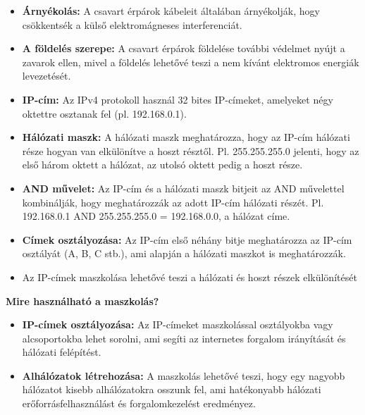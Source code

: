 \documentclass[11pt,a4paper]{article}
\begin{document}
\begin{tcolorbox}[colback=blue!5!white,colframe=blue!50!black,title= 42. Ismertesse az ethernet hálózaton használt eszközöket!]
\begin{itemize}
                                            \item \textbf{Árnyékolás:} A csavart érpárok kábeleit általában árnyékolják, hogy csökkentsék a külső elektromágneses interferenciát.
                                            \item \textbf{A földelés szerepe:} A csavart érpárok földelése további védelmet nyújt a zavarok ellen, mivel a földelés lehetővé teszi a nem kívánt elektromos energiák levezetését.
                                        \end{itemize}
            \end{tcolorbox}
            
            \begin{tcolorbox}[colback=blue!5!white,colframe=blue!50!black,title= 43. Ismertesse az internetes címek maszkolási algoritmusát!]
                \begin{itemize}
                    \item \textbf{IP-cím:} Az IPv4 protokoll használ 32 bites IP-címeket, amelyeket négy oktettre osztanak fel (pl. 192.168.0.1).
                    \item \textbf{Hálózati maszk:} A hálózati maszk meghatározza, hogy az IP-cím hálózati része hogyan van elkülönítve a hoszt résztől. Pl. 255.255.255.0 jelenti, hogy az első három oktett a hálózat, az utolsó oktett pedig a hoszt része.
                    \item \textbf{AND művelet:} Az IP-cím és a hálózati maszk bitjeit az AND művelettel kombinálják, hogy meghatározzák az adott IP-cím hálózati részét. Pl. 192.168.0.1 AND 255.255.255.0 = 192.168.0.0, a hálózat címe.
                    \item \textbf{Címek osztályozása:} Az IP-cím első néhány bitje meghatározza az IP-cím osztályát (A, B, C stb.), ami alapján a hálózati maszkot is meghatározzák.
                    \item Az IP-címek maszkolása lehetővé teszi a hálózati és hoszt részek elkülönítését 
                \end{itemize}    
                \textbf{Mire használható a maszkolás?}
                \begin{itemize}
                    \item \textbf{IP-címek osztályozása:} Az IP-címeket maszkolással osztályokba vagy alcsoportokba lehet sorolni, ami segíti az internetes forgalom irányítását és hálózati felépítést.
                    \item \textbf{Alhálózatok létrehozása:} A maszkolás lehetővé teszi, hogy egy nagyobb hálózatot kisebb alhálózatokra osszunk fel, ami hatékonyabb hálózati erőforrásfelhasználást és forgalomkezelést eredményez.

\end{itemize}
\end{tcolorbox}
\end{document}
